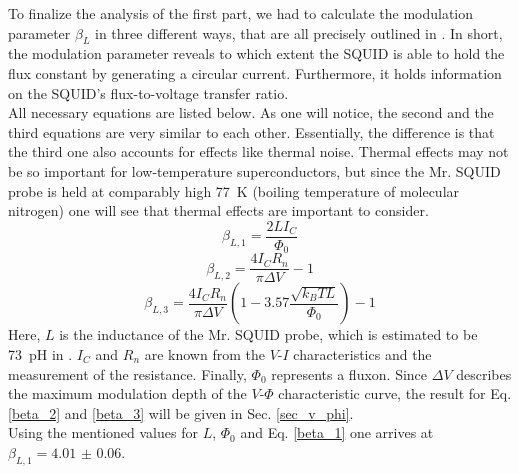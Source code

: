 \documentclass[a4paper,10pt]{article}
\begin{document}
To finalize the analysis of the first part, we had to calculate the modulation parameter $\beta_L$ in three different ways, that are all precisely outlined in \cite{skriptum}. In short, the modulation parameter reveals to which extent the SQUID is able to hold the flux constant by generating a circular current. Furthermore, it holds information on the SQUID's flux-to-voltage transfer ratio. 
\\
All necessary equations are listed below. As one will notice, the second and the third equations are very similar to each other. Essentially, the difference is that the third one also accounts for effects like thermal noise. Thermal effects may not be so important for low-temperature superconductors, but since the Mr. SQUID probe is held at comparably high \SI{77}{\kelvin} (boiling temperature of molecular nitrogen) one will see that thermal effects are important to consider. 
\begin{equation}
    \label{beta_1}
    \beta_{L,1} = \frac{2 L I_C}{\Phi_0}
\end{equation}
\begin{equation}
    \label{beta_2}
    \beta_{L,2} = \frac{4 I_C R_n}{\pi \Delta V} - 1
\end{equation}
\begin{equation}
    \label{beta_3}
    \beta_{L,3} = \frac{4 I_C R_n}{\pi \Delta V} \left( 1 - 3.57  \frac{\sqrt{k_B T L}}{\Phi_0} \right) - 1
\end{equation}
Here, $L$ is the inductance of the Mr. SQUID probe, which is estimated to be \SI{73}{\pico \henry} in \cite{skriptum}. $I_C$ and $R_n$ are known from the $V$-$I$ characteristics and the measurement of the resistance. Finally, $\Phi_0$ represents a fluxon. Since $\Delta V$ describes the maximum modulation depth of the $V$-$\Phi$ characteristic curve, the result for Eq. \ref{beta_2} and \ref{beta_3} will be given in Sec. \ref{sec_v_phi}. 
\\
Using the mentioned values for $L$, $\Phi_0$ and Eq. \ref{beta_1} one arrives at $\beta_{L,1} = \num{4.01(6)}$. 
\end{document}
